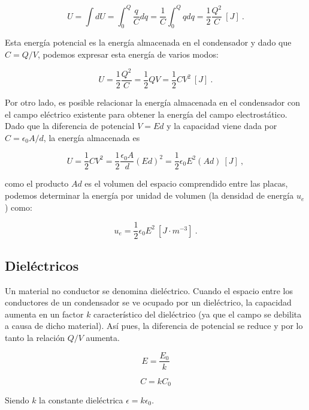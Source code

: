 \documentclass{tufte-handout}
\begin{document}
\begin{equation}
U = \int dU = \int_0^Q \frac{q}{C}dq = \frac{1}{C}\int_0^Q qdq = \frac{1}{2}\frac{Q^2}{C}~[J]~.
\end{equation}

Esta energía potencial es la energía almacenada en el condensador y dado que $C = Q/V$, podemos expresar esta energía de varios modos:

\begin{equation}
U = \frac{1}{2}\frac{Q^2}{C} = \frac{1}{2}QV = \frac{1}{2}CV^2~[J]~.
\end{equation}

Por otro lado, es posible relacionar la energía almacenada en el condensador con el campo eléctrico existente para obtener la energía del campo electrostático. Dado que la diferencia de potencial $V = Ed$ y la capacidad viene dada por $C = \epsilon_0 A/d$, la energía almacenada es

\begin{equation}
U = \frac{1}{2}CV^2 = \frac{1}{2}\frac{\epsilon_0A}{d}(Ed)^2 = \frac{1}{2}\epsilon_0E^2(Ad)~[J]~,
\end{equation}

como el producto $Ad$ es el volumen del espacio comprendido entre las placas, podemos determinar la energía por unidad de volumen (la densidad de energía $u_e$) como:

\begin{equation}
u_e = \frac{1}{2}\epsilon_0E^2~[J\cdot m^{-3}]~.
\end{equation}

\subsection{Dieléctricos}

Un material no conductor se denomina dieléctrico. Cuando el espacio entre los conductores de un condensador se ve ocupado por un dieléctrico, la capacidad aumenta en un factor $k$ característico del dieléctrico (ya que el campo se debilita a causa de dicho material). Así pues, la diferencia de potencial se reduce y por lo tanto la relación $Q/V$ aumenta. 

\begin{equation}
E = \frac{E_0}{k}
\end{equation}

\begin{equation}
C = kC_0
\end{equation}

Siendo $k$ la constante dieléctrica $\epsilon = k\epsilon_0$.
\end{document}
